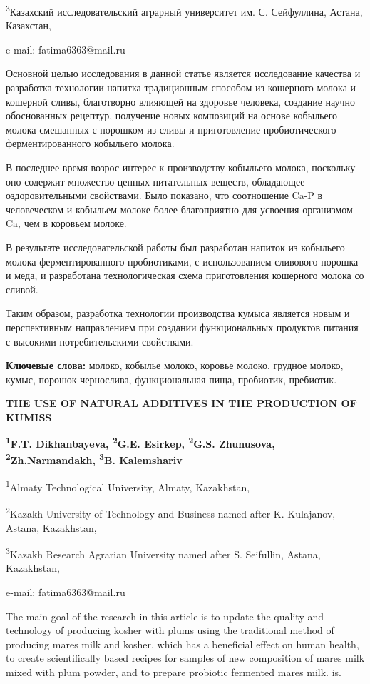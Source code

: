 \textsuperscript{3}Казахский исследовательский аграрный университет им.
С. Сейфуллина, Астана, Казахстан,

e-mail: fatima6363@mail.ru

Основной целью исследования в данной статье является исследование
качества и разработка технологии напитка традиционным способом из
кошерного молока и кошерной сливы, благотворно влияющей на здоровье
человека, создание научно обоснованных рецептур, получение новых
композиций на основе кобыльего молока смешанных с порошком из сливы и
приготовление пробиотического ферментированного кобыльего молока.

В последнее время возрос интерес к производству кобыльего молока,
поскольку оно содержит множество ценных питательных веществ, обладающее
оздоровительными свойствами. Было показано, что соотношение Ca-P в
человеческом и кобыльем молоке более благоприятно для усвоения
организмом Ca, чем в коровьем молоке.

В результате исследовательской работы был разработан напиток из
кобыльего молока ферментированного пробиотиками, с использованием
сливового порошка и меда, и разработана технологическая схема
приготовления кошерного молока со сливой.

Таким образом, разработка технологии производства кумыса является новым
и перспективным направлением при создании функциональных продуктов
питания с высокими потребительскими свойствами.

{\bfseries Ключевые слова:} молоко, кобылье молоко, коровье молоко, грудное
молоко, кумыс, порошок чернослива, функциональная пища, пробиотик,
пребиотик.

{\bfseries THE USE OF NATURAL ADDITIVES IN THE PRODUCTION OF KUMISS}

{\bfseries \textsuperscript{1}F.T. Dikhanbayeva, \textsuperscript{2}G.E.
Esirkep, \textsuperscript{2}G.S. Zhunusova,
\textsuperscript{2}Zh.Narmandakh, \textsuperscript{3}B. Kalemshariv}

\textsuperscript{1}Almaty Technological University, Almaty, Kazakhstan,

\textsuperscript{2}Kazakh University of Technology and Business named
after K. Kulajanov, Astana, Kazakhstan,

\textsuperscript{3}Kazakh Research Agrarian University named after S.
Seifullin, Astana, Kazakhstan,

e-mail: fatima6363@mail.ru

The main goal of the research in this article is to update the quality
and technology of producing kosher with plums using the traditional
method of producing mare\textquotesingle s milk and kosher, which has a
beneficial effect on human health, to create scientifically based
recipes for samples of new composition of mare\textquotesingle s milk
mixed with plum powder, and to prepare probiotic fermented
mare\textquotesingle s milk. is.

